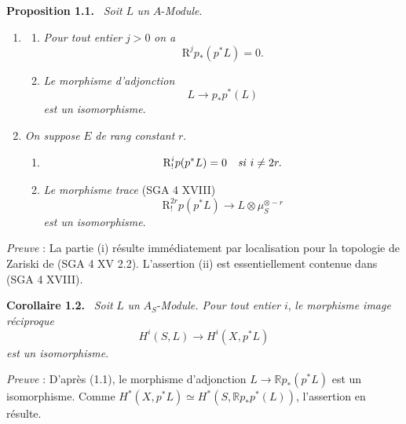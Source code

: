 \documentclass[11pt]{article}
\newenvironment{statement}[1]{\par\medskip\noindent\textbf{#1.}\ }{\par\medskip}
\newcommand{\R}{\mathbb{R}}\newcommand{\RHomCore}{\mathbb{R}\mathrm{Hom}}
\providecommand{\R}{\mathrm R}
\begin{document}
\begin{statement}{Proposition 1.1}
\emph{Soit} $L$ \emph{un} $A$-\emph{Module}.
\begin{enumerate}[label=(\roman*)]
\item
\begin{enumerate}[label=\alph*)]
\item \emph{Pour tout entier} $j>0$ \emph{on a}
\[
\mathrm{R}^j p_*(p^*L)=0.
\]
\item \emph{Le morphisme d'adjonction}
\[
L\longrightarrow p_*p^*(L)
\]
\emph{est un isomorphisme}.
\end{enumerate}
\item \emph{On suppose} $E$ \emph{de rang constant} $r$.
\begin{enumerate}[label=\alph*)]
\item
\[
\mathrm{R}_!^i p(p^*L)=0\quad\text{\emph{si} }i\ne 2r.
\]
\item \emph{Le morphisme trace} (SGA 4 XVIII)
\[
\mathrm{R}_!^{2r}p(p^*L)\longrightarrow L\otimes\mu_S^{\otimes -r}
\]
\emph{est un isomorphisme}.
\end{enumerate}
\end{enumerate}
\end{statement}

\emph{Preuve} : La partie (i) résulte immédiatement par localisation pour la topologie de Zariski de (SGA 4 XV 2.2). L'assertion (ii) est essentiellement contenue dans (SGA 4 XVIII).

\begin{statement}{Corollaire 1.2}
\emph{Soit} $L$ \emph{un} $A_S$-\emph{Module. Pour tout entier} $i$, \emph{le morphisme image réciproque}
\[
H^i(S,L)\longrightarrow H^i(X,p^*L)
\]
\emph{est un isomorphisme}.
\end{statement}

\emph{Preuve} : D'après (1.1), le morphisme d'adjonction $L\to \R p_*(p^*L)$ est un isomorphisme. Comme $H^*(X,p^*L)\simeq H^*(S,\R p_*p^*(L))$, l'assertion en résulte.
\end{document}
